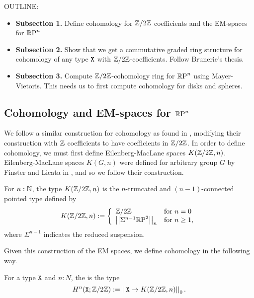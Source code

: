 \documentclass{amsart}
\begin{document}
OUTLINE:
\begin{itemize}
\item 
  \textbf{Subsection 1.} 
  Define cohomology for $ \mathbb{Z}/2\mathbb{Z} $ coefficients and the
  EM-spaces for $ \mathbb{R}\textrm{P}^n $
\item
  \textbf{Subsection 2.} Show that we get a commutative
  graded ring structure for cohomology of any type $ \mathtt{X} $
  with $ \mathbb{Z}/2\mathbb{Z} $-coefficients. Follow Brunerie's thesis.
\item
  \textbf{Subsection 3.} Compute $ \mathbb{Z}/2\mathbb{Z} $-cohomology ring
  for $ \mathbb{R}\textrm{P}^n $ using Mayer-Vietoris.  This needs us to
  first compute cohomology for disks and spheres.  
\end{itemize}


\subsection{Cohomology and EM-spaces for $\mathbb{R}\textrm{P}^n$}


We follow a similar construction for cohomology as found in \cite{brunerie:thesis}, modifying their construction with $\mathbb{Z}$ coefficients to have coefficients in $\mathbb{Z}/2\mathbb{Z}$. In order to define cohomology, we must first define Eilenberg-MacLane spaces $K(\mathbb{Z}/2\mathbb{Z},n)$. Eilenberg-MacLane spaces $K(G,n)$ were defined for arbitrary group $G$ by Finster and Licata in \cite{fl:em}, and so we follow their construction. 

\begin{definition}
	For $n:\mathbb{N}$, the type  $K(\mathbb{Z}/2\mathbb{Z},n)$ is the $n$-truncated and $(n-1)$-connected pointed type defined by
	\[ K(\mathbb{Z}/2\mathbb{Z},n):=\left\{ \begin{array}{ll} \mathbb{Z}/2\mathbb{Z} & \text{for }n=0\\
	\left| \left| \Sigma^{n-1}\mathbb{R}\textrm{P}^2\right| \right|_n & \text{for } n\ge 1, 
	\end{array}\right.\]
	where $\Sigma^{n-1}$ indicates the reduced suspension. 
\end{definition}


Given this construction of the EM spaces, we define cohomology in the following way. 

\begin{definition}
	For a type $\mathtt{X}$ and $n:N$, the  is the type
	\[H^n(\mathtt{X};\mathbb{Z}/2\mathbb{Z}):= \left| \left| \mathtt{X}\rightarrow K(\mathbb{Z}/2\mathbb{Z},n)\right| \right|_0.\] 
\end{definition}
\end{document}
